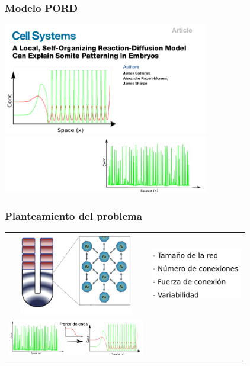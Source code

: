 \documentclass[xcolor=table, xllnames]{beamer}
\begin{document}
\begin{frame}
	\frametitle{Modelo PORD}
	\centering
	\includegraphics[width=9cm]{Figuras/reaction-difusion.png} \\ 
	\pause
	\includegraphics[width=9cm]{Figuras/reaction-difusion3.png}
\end{frame}


\begin{frame}
	\frametitle{Planteamiento del problema}
	\begin{table}
		
	\begin{tabular}{c c}
	\centering
	\includegraphics[width=5cm]{Figuras/Diapo14d} & 	\includegraphics[width=4cm]{Figuras/Diapo14e} \\ %
	\includegraphics[width=6cm]{Figuras/Diapo14b}  
	
	
\end{tabular}
\end{table}
\end{frame}
\end{document}
